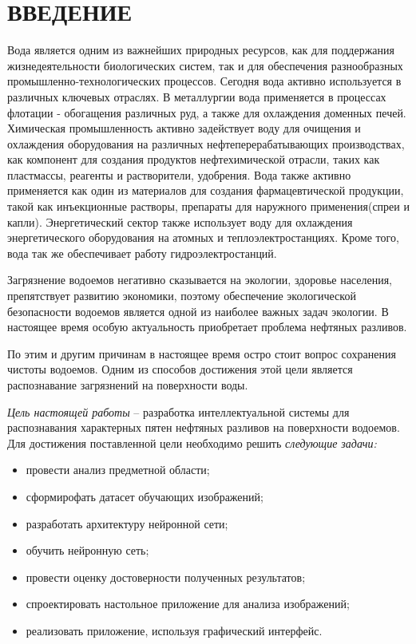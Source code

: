 \section*{ВВЕДЕНИЕ}

Вода является одним из важнейших природных ресурсов, как для поддержания жизнедеятельности биологических систем, так и для обеспечения разнообразных промышленно-технологических процессов.  Сегодня вода активно используется в различных ключевых отраслях. В металлургии вода применяется в процессах флотации - обогащения различных руд, а также для охлаждения доменных печей. Химическая промышленность активно задействует воду  для очищения и охлаждения оборудования на различных нефтеперерабатывающих производствах, как компонент для создания продуктов нефтехимической отрасли, таких как пластмассы, реагенты и растворители, удобрения. Вода также активно применяется как один из материалов для создания фармацевтической продукции, такой как инъекционные растворы, препараты для наружного применения(спреи и капли).  Энергетический сектор также использует воду для охлаждения энергетического оборудования на атомных и теплоэлектростанциях. Кроме того, вода так же обеспечивает работу гидроэлектростанций. 

Загрязнение водоемов негативно сказывается на экологии, здоровье населения, препятствует развитию экономики, поэтому обеспечение экологической безопасности водоемов является одной из наиболее важных задач экологии. В настоящее время особую актуальность приобретает проблема нефтяных разливов.

По этим и другим причинам в настоящее время остро стоит вопрос сохранения чистоты водоемов. Одним из способов достижения этой цели является распознавание загрязнений на поверхности воды.

\emph{Цель настоящей работы} – разработка интеллектуальной системы для распознавания характерных пятен нефтяных разливов на поверхности водоемов. Для достижения поставленной цели необходимо решить \emph{следующие задачи:}
\begin{itemize}
\item провести анализ предметной области;
\item сформирофать датасет обучающих изображений;
\item разработать архитектуру нейронной сети;
\item обучить нейронную сеть;
\item провести оценку достоверности полученных результатов;
\item спроектировать настольное приложение для анализа изображений;
\item реализовать приложение, используя графический интерфейс.
\end{itemize}

